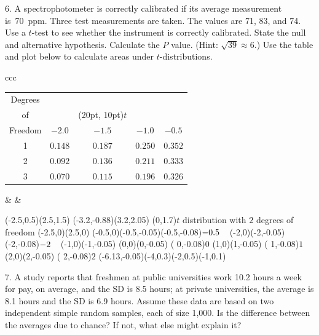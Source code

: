 \documentclass[10pt]{article}
\begin{document}
6.  A spectrophotometer is correctly calibrated if its average measurement is~70~ppm.
Three test measurements are taken.  The values are 71, 83, and 74.  Use  a
$t$-test to see whether the instrument is correctly calibrated.  
State the null and alternative hypothesis. Calculate the $P$ value.
(Hint:  $\sqrt{39}\approx 6$.)  Use the table and plot below to calculate
areas under  $t$-distributions.
\smallskip

\begin{tabular}{ccc}
\begin{tabular}{|c|cccc|}\hline
Degrees\vphantom{\LARGE Y} & &&&\\
of      & &\rput(20pt, 10pt){$t$}&&\\
Freedom & $-2.0$ & $-1.5$ & $-1.0$ & $-0.5$\\[3pt]\hline
1       & $0.148$ & $0.187$ & $0.250$ & $0.352$\vphantom{\LARGE Y}\\
2       & $0.092$ & $0.136$ & $0.211$ & $0.333$\\
3       & $0.070$ & $0.115$ & $0.196$ & $0.326$\\\hline
\end{tabular}
&\hspace{1in} &
\begin{pspicture}(-2.5,0.5)(2.5,1.5)
\psframe[linewidth=0.02](-3.2,-0.88)(3.2,2.05)
\rput(0,1.7){$t$ distribution with $2$ degrees of freedom}
\psline{<->}(-2.5,0)(2.5,0)
\psline(-0.5,0)(-0.5,-0.05)\rput[t](-0.5,-0.08){\footnotesize$-0.5\hphantom{-}$}
\psline(-2,0)(-2,-0.05)    \rput[t](-2,-0.08){\footnotesize$-2\hphantom{-}$}
\psline(-1,0)(-1,-0.05)   %
\psline(0,0)(0,-0.05)      \rput[t]( 0,-0.08){\footnotesize$0$}
\psline(1,0)(1,-0.05)      \rput[t]( 1,-0.08){\footnotesize$1$}
\psline(2,0)(2,-0.05)      \rput[t]( 2,-0.08){\footnotesize$2$}
\psbezier{->}(-6.13,-0.05)(-4,0.3)(-2,0.5)(-1,0.1)
\end{pspicture}
\end{tabular}
\vspace{2in}
\vfill
\eject

7. A study reports that freshmen at public universities work 10.2 hours a week for pay,
on average, and the SD is 8.5 hours;
at private universities, the average is 8.1 hours and the SD is 6.9 hours.
Assume these data are based on two independent simple random samples, each of
size 1,000.  Is the difference between the
averages due to chance?  If not, what else might explain it?
\vspace{2in}
\end{document}
